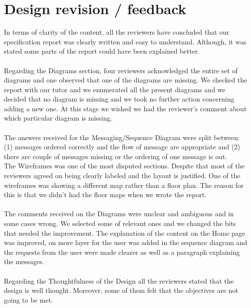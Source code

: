 \documentclass{sig-alt-release2}
\begin{document}

\section{Design revision / feedback}

In terms of clarity of the content, all the reviewers have concluded that our 
specification report was clearly written and easy to understand. Although, it 
was stated some parts of the report could have been explained better.\\
\\
Regarding the Diagrams section, four reviewers acknowledged the entire set of 
diagrams and one observed that one of the diagrams are missing.  We checked the 
report with our tutor and we enumerated all the present diagrams and we decided 
that no diagram is missing and we took no further action concerning adding a new 
one. At this stage we wished we had the reviewer's comment about which particular 
diagram is missing.\\
\\
The answers received for the Messaging/Sequence Diagram were split between: (1) 
messages ordered correctly and the flow of message are appropriate and (2) there 
are couple of messages missing or the ordering of one message is out. \\
The Wireframes was one of the most disputed sections. Despite that most of the 
reviewers agreed on being clearly labeled and the layout is justified. One of 
the wireframes was showing a different map rather than  a floor plan. The 
reason for this is that we didn't had the floor maps when we wrote the report.\\
\\
The comments received on the Diagrams were unclear and ambiguous and in some cases 
wrong. We selected some of relevant ones and we changed the bits that needed the 
improvement. The explanation of the content on the Home page was improved, on more 
layer for the user was added in the sequence diagram and the requests from the 
user were made clearer as well as a paragraph explaining the messages.\\
\\
Regarding the Thoughtfulness of the Design all the reviewers stated that 
the design is well thought. Moreover, some of them felt that the objectives 
are not going to be met.\\
\end{document}
